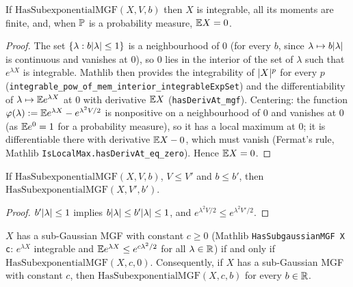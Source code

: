 \begin{lemma}\label{lem:ps_subexp_integral_zero}
\leanok
{}
If $\mathrm{HasSubexponentialMGF}(X,V,b)$ then $X$ is integrable, all its moments are finite,
and, when $\mathbb{P}$ is a probability measure, $\mathbb{E} X = 0$.
\end{lemma}

\begin{proof}
\leanok
{}
The set $\{\lambda : b\lvert \lambda \rvert \le 1\}$ is a neighbourhood of $0$ (for every $b$, since
$\lambda \mapsto b\lvert \lambda \rvert$ is continuous and vanishes at $0$), so $0$ lies in the interior
of the set of $\lambda$ such that $e^{\lambda X}$ is integrable. Mathlib then provides the
integrability of $\lvert X \rvert^p$ for every $p$
(\texttt{integrable\_pow\_of\_mem\_interior\_integrableExpSet}) and the differentiability of
$\lambda \mapsto \mathbb{E} e^{\lambda X}$ at $0$ with derivative $\mathbb{E} X$ (\texttt{hasDerivAt\_mgf}).
Centering: the function $\varphi(\lambda) := \mathbb{E} e^{\lambda X} - e^{\lambda^2V/2}$ is
nonpositive on a neighbourhood of $0$ and vanishes at $0$ (as $\mathbb{E} e^{0} = 1$ for a probability
measure), so it has a local maximum at $0$; it is differentiable there with derivative
$\mathbb{E} X - 0$, which must vanish (Fermat's rule, Mathlib \texttt{IsLocalMax.hasDerivAt\_eq\_zero}).
Hence $\mathbb{E} X = 0$.
\end{proof}

\begin{lemma}\label{lem:ps_subexp_mono}
\leanok
{}
If $\mathrm{HasSubexponentialMGF}(X,V,b)$, $V \le V'$ and $b \le b'$, then
$\mathrm{HasSubexponentialMGF}(X,V',b')$.
\end{lemma}

\begin{proof}
\leanok
{}
$b'\lvert \lambda \rvert \le 1$ implies $b\lvert \lambda \rvert \le b'\lvert \lambda \rvert \le 1$, and
$e^{\lambda^2V/2} \le e^{\lambda^2V'/2}$.
\end{proof}

\begin{lemma}[Sub-Gaussian is sub-exponential with $b = 0$]\label{lem:subexp_of_subgaussian}
\leanok
{}
$X$ has a sub-Gaussian MGF with constant $c \ge 0$ (Mathlib
\texttt{HasSubgaussianMGF X c}: $e^{\lambda X}$ integrable and $\mathbb{E} e^{\lambda X} \le e^{c\lambda^2/2}$
for all $\lambda\in\mathbb{R}$) if and only if $\mathrm{HasSubexponentialMGF}(X, c, 0)$. Consequently,
if $X$ has a sub-Gaussian MGF with constant $c$, then $\mathrm{HasSubexponentialMGF}(X, c, b)$
for every $b \in \mathbb{R}$.
\end{lemma}

